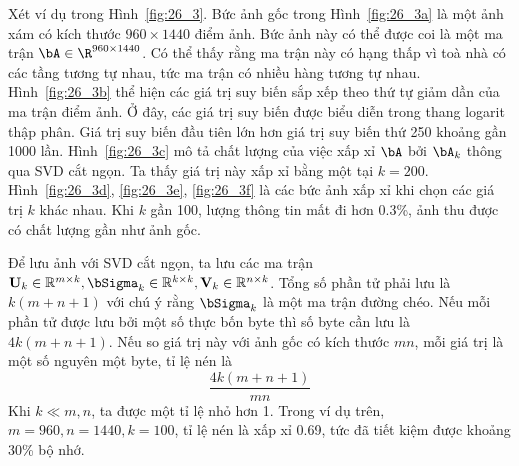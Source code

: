 Xét ví dụ trong Hình~\ref{fig:26_3}. Bức ảnh gốc trong Hình~\ref{fig:26_3a} là
một ảnh xám có
kích thước
$960\times 1440$ điểm ảnh. Bức ảnh này có thể được coi là một ma trận $\bA \in
\R^{960\times 1440}$. Có thể thấy rằng ma trận này có hạng thấp vì toà nhà có các tầng tương tự nhau, tức ma trận có nhiều hàng tương tự nhau.
Hình~\ref{fig:26_3b} thể hiện các giá trị suy biến sắp xếp theo thứ tự giảm dần
của ma trận điểm ảnh. Ở đây, các giá trị suy biến được biểu diễn trong thang logarit thập phân. Giá trị suy biến đầu tiên lớn hơn giá trị suy biến thứ 250 khoảng gần 1000 lần. Hình~\ref{fig:26_3c} mô tả chất lượng của việc xấp xỉ $\bA$ bởi
$\bA_k$ thông qua SVD cắt ngọn. Ta thấy giá trị này xấp xỉ bằng một tại $k =
200$. Hình~\ref{fig:26_3d}, \ref{fig:26_3e}, \ref{fig:26_3f} là các bức ảnh xấp
xỉ khi chọn các giá trị $k$ khác nhau. Khi $k$ gần 100, lượng thông tin mất đi hơn 0.3\%, ảnh thu được có chất lượng gần như ảnh gốc.


Để lưu ảnh với SVD cắt ngọn, ta lưu các ma trận $\mathbf{U}_k \in
\mathbb{R}^{m \times k}, \bSigma_k \in \mathbb{R}^{k \times k}, \mathbf{V}_k \in
\mathbb{R}^{n \times k}$. Tổng số phần tử phải lưu là $k(m + n + 1)$ với chú ý
rằng $\bSigma_k$ là một ma trận đường chéo. Nếu mỗi phần
tử được lưu bởi một số thực bốn byte thì số byte cần lưu là $4k(m + n + 1)$. Nếu so giá trị này với ảnh gốc có kích thước $mn$, mỗi giá trị là một số
nguyên một byte, tỉ lệ nén là
\begin{equation}
\frac{4k(m + n + 1)}{mn}
\end{equation}
Khi $k \ll m, n$, ta được một tỉ lệ nhỏ hơn 1. Trong ví dụ trên, $m =
960, n = 1440, k = 100$, tỉ lệ nén là xấp xỉ 0.69, tức đã tiết kiệm được
khoảng 30\% bộ nhớ.





